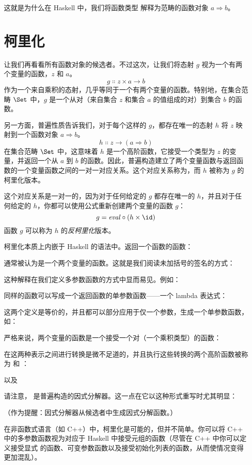 这就是为什么在 Haskell 中，我们将函数类型  解释为范畴的函数对象 $a \Rightarrow b$。

\section{柯里化}

让我们再看看所有函数对象的候选者。不过这次，让我们将态射 $g$ 视为一个有两个变量的函数，$z$ 和 $a$。
\[g \Colon z \times a \to b\]
作为一个来自乘积的态射，几乎等同于一个有两个变量的函数。特别地，在集合范畴 $\Set$ 中，$g$ 是一个从对（来自集合 $z$ 和集合 $a$ 的值组成的对）到集合 $b$ 的函数。

另一方面，普遍性质告诉我们，对于每个这样的 $g$，都存在唯一的态射 $h$ 将 $z$ 映射到一个函数对象 $a \Rightarrow b$。
\[h \Colon z \to (a \Rightarrow b)\]
在集合范畴 $\Set$ 中，这意味着 $h$ 是一个高阶函数，它接受一个类型为 $z$ 的变量，并返回一个从 $a$ 到 $b$ 的函数。因此，普遍构造建立了两个变量函数与返回函数的一个变量函数之间的一对一对应关系。这个对应关系称为，而 $h$ 被称为 $g$ 的柯里化版本。

这个对应关系是一对一的，因为对于任何给定的 $g$ 都存在唯一的 $h$，并且对于任何给定的 $h$，你都可以使用公式重新创建两个变量的函数 $g$：
\[g = \mathit{eval} \circ (h \times \id)\]
函数 $g$ 可以称为 $h$ 的\emph{反柯里化}版本。

柯里化本质上内嵌于 Haskell 的语法中。返回一个函数的函数：

通常被认为是一个两个变量的函数。这就是我们阅读未加括号的签名的方式：

这种解释在我们定义多参数函数的方式中显而易见。例如：

同样的函数可以写成一个返回函数的单参数函数——一个 lambda 表达式：

这两个定义是等价的，并且都可以部分应用于仅一个参数，生成一个单参数函数，如：

严格来说，两个变量的函数是一个接受一个对（一个乘积类型）的函数：

在这两种表示之间进行转换是微不足道的，并且执行这些转换的两个高阶函数被称为 和 ：

以及

请注意， 是普遍构造的因式分解器。这一点在它以这种形式重写时尤其明显：

（作为提醒：因式分解器从候选者中生成因式分解函数。）

在非函数式语言（如 C++）中，柯里化是可能的，但并不简单。你可以将 C++ 中的多参数函数视为对应于 Haskell 中接受元组的函数（尽管在 C++ 中你可以定义接受显式  的函数、可变参数函数以及接受初始化列表的函数，从而使情况变得更加混乱）。

